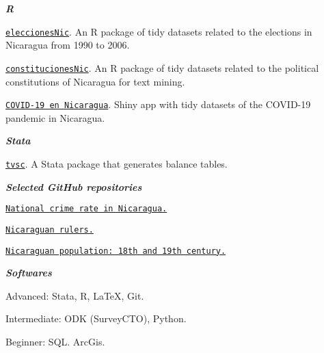 \documentclass[11pt,article,oneside, a4paper]{memoir}
\begin{document}
\medskip

\noindent\emph{\textbf{R} \vspace{0.05in}}

\ind \texttt{\href{https://github.com/RRMaximiliano/eleccionesNic}{eleccionesNic}}. An R package of tidy datasets related to the elections in Nicaragua from 1990 to 2006.

\ind \texttt{\href{https://github.com/RRMaximiliano/constitucionesNic}{constitucionesNic}}. An R package of tidy datasets related to the political constitutions of Nicaragua for text mining.

\ind \texttt{\href{https://rrmaximiliano.shinyapps.io/covid-nicaragua/}{COVID-19 en Nicaragua}}. Shiny app with tidy datasets of the COVID-19 pandemic in Nicaragua.

\medskip
\noindent\emph{\textbf{Stata} \vspace{0.05in}}

\ind \texttt{\href{https://github.com/RRMaximiliano/tvsc}{tvsc}}. A Stata package that generates balance tables.

\medskip
\noindent\emph{\textbf{Selected GitHub repositories} \vspace{0.05in}}

\ind \texttt{\href{https://github.com/RRMaximiliano/policia-nacional-nic-stats}{National crime rate in Nicaragua.}}

\ind \texttt{\href{https://github.com/RRMaximiliano/nicaraguan-rulers}{Nicaraguan rulers.}}

\ind \texttt{\href{https://github.com/RRMaximiliano/poblacion-nicaragua-siglo-18-19}{Nicaraguan population: 18th and 19th century.}} 

\medskip

\noindent\emph{\textbf{Softwares} \vspace{0.05in}}

\ind Advanced: Stata, R, \LaTeX, Git.

\ind Intermediate: ODK (SurveyCTO), Python.

\ind Beginner: SQL. ArcGis.
\end{document}
